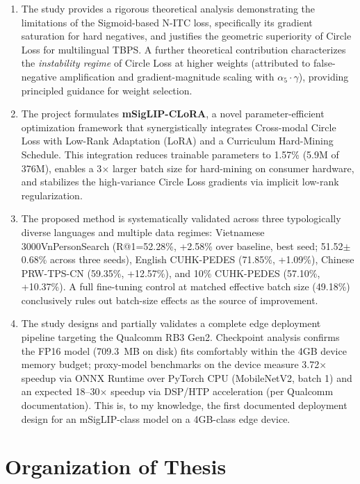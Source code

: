 \documentclass[../main.tex]{subfiles}
\begin{document}
\begin{enumerate}
    \item The study provides a rigorous theoretical analysis demonstrating the limitations of the Sigmoid-based N-ITC loss, specifically its gradient saturation for hard negatives, and justifies the geometric superiority of Circle Loss for multilingual TBPS. A further theoretical contribution characterizes the \textit{instability regime} of Circle Loss at higher weights (attributed to false-negative amplification and gradient-magnitude scaling with $\alpha_5 \cdot \gamma$), providing principled guidance for weight selection.

    \item The project formulates \textbf{mSigLIP-CLoRA}, a novel parameter-efficient optimization framework that synergistically integrates Cross-modal Circle Loss with Low-Rank Adaptation (LoRA) and a Curriculum Hard-Mining Schedule. This integration reduces trainable parameters to 1.57\% (5.9M of 376M), enables a 3$\times$ larger batch size for hard-mining on consumer hardware, and stabilizes the high-variance Circle Loss gradients via implicit low-rank regularization.

    \item The proposed method is systematically validated across three typologically diverse languages and multiple data regimes: Vietnamese 3000VnPersonSearch (R@1=52.28\%, +2.58\% over baseline, best seed; 51.52$\pm$0.68\% across three seeds), English CUHK-PEDES (71.85\%, +1.09\%), Chinese PRW-TPS-CN (59.35\%, +12.57\%), and 10\% CUHK-PEDES (57.10\%, +10.37\%). A full fine-tuning control at matched effective batch size (49.18\%) conclusively rules out batch-size effects as the source of improvement.

    \item The study designs and partially validates a complete edge deployment pipeline targeting the Qualcomm RB3 Gen2. Checkpoint analysis confirms the FP16 model (709.3~MB on disk) fits comfortably within the 4GB device memory budget; proxy-model benchmarks on the device measure 3.72$\times$ speedup via ONNX Runtime over PyTorch CPU (MobileNetV2, batch 1) and an expected 18--30$\times$ speedup via DSP/HTP acceleration (per Qualcomm documentation). This is, to my knowledge, the first documented deployment design for an mSigLIP-class model on a 4GB-class edge device.
\end{enumerate}


\section{Organization of Thesis}
\label{sec:organization}
\end{document}
